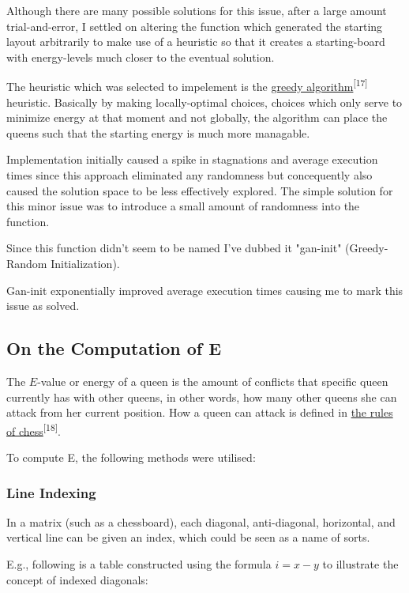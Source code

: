 \documentclass{article}
\begin{document}
Although there are many possible solutions for this issue, after a large amount trial-and-error,
I settled on altering the function which generated the starting layout arbitrarily to make use of a heuristic so that it creates
a starting-board with energy-levels much closer to the eventual solution.

The heuristic which was selected to impelement is the \href{https://en.wikipedia.org/wiki/Greedy_algorithm}{greedy algorithm}\textsuperscript{[17]} heuristic.
Basically by making locally-optimal choices, choices which only serve to minimize energy at that moment and not globally,
the algorithm can place the queens such that the starting energy is much more managable.

Implementation initially caused a spike in stagnations and average execution times since this approach eliminated any randomness
but concequently also caused the solution space to be less effectively explored. The simple solution for this minor issue was to introduce a small amount of randomness
into the function.

Since this function didn't seem to be named I've dubbed it "gan-init" (Greedy-Random Initialization).

Gan-init exponentially improved average execution times causing me to mark this issue as solved.

\subsection{On the Computation of E}
The $E$-value or energy of a queen is the amount of conflicts that specific queen currently has with other queens, in other words,
how many other queens she can attack from her current position. How a queen can attack is defined in
\href{https://en.wikipedia.org/wiki/Queen_(chess)\#Placement\_and\_movement}{the rules of chess}\textsuperscript{[18]}.

To compute E, the following methods were utilised:

\subsubsection{Line Indexing}
In a matrix (such as a chessboard), each diagonal, anti-diagonal, horizontal, and vertical line can be given an index, which could be seen as a name of sorts.

E.g., following is a table constructed using the formula $i = x-y$ to illustrate the concept of indexed diagonals:
\end{document}
